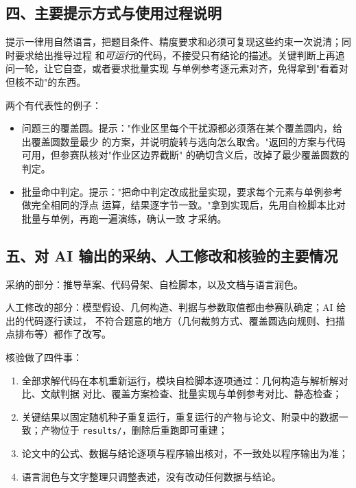 \documentclass[12pt,a4paper]{ctexart}
\begin{document}
\subsection*{四、主要提示方式与使用过程说明}

提示一律用自然语言，把题目条件、精度要求和必须可复现这些约束一次说清；同时要求给出推导过程
和\emph{可运行}的代码，不接受只有结论的描述。关键判断上再追问一轮，让它自查，或者要求批量实现
与单例参考逐元素对齐，免得拿到"看着对但核不动"的东西。

两个有代表性的例子：

\begin{itemize}
  \item 问题三的覆盖圆。提示："作业区里每个干扰源都必须落在某个覆盖圆内，给出覆盖圆数量最少
    的方案，并说明旋转与选向怎么取舍。"返回的方案与代码可用，但参赛队核对"作业区边界截断"
    的确切含义后，改掉了最少覆盖圆数的判定。
  \item 批量命中判定。提示："把命中判定改成批量实现，要求每个元素与单例参考做完全相同的浮点
    运算，结果逐字节一致。"拿到实现后，先用自检脚本比对批量与单例，再跑一遍演练，确认一致
    才采纳。
\end{itemize}

\subsection*{五、对 AI 输出的采纳、人工修改和核验的主要情况}

采纳的部分：推导草案、代码骨架、自检脚本，以及文档与语言润色。

人工修改的部分：模型假设、几何构造、判据与参数取值都由参赛队确定；AI 给出的代码逐行读过，
不符合题意的地方（几何裁剪方式、覆盖圆选向规则、扫描点排布等）都作了改写。

核验做了四件事：

\begin{enumerate}
  \item 全部求解代码在本机重新运行，模块自检脚本逐项通过：几何构造与解析解对比、文献判据
    对比、覆盖方案检查、批量实现与单例参考对比、静态检查；
  \item 关键结果以固定随机种子重复运行，重复运行的产物与论文、附录中的数据一致；产物位于
    \texttt{results/}，删除后重跑即可重建；
  \item 论文中的公式、数据与结论逐项与程序输出核对，不一致处以程序输出为准；
  \item 语言润色与文字整理只调整表述，没有改动任何数据与结论。
\end{enumerate}
\end{document}
